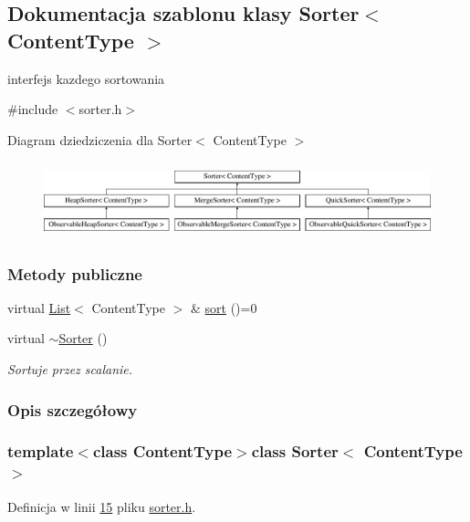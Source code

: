 \hypertarget{class_sorter}{\subsection{Dokumentacja szablonu klasy Sorter$<$ Content\-Type $>$}
\label{class_sorter}
}


interfejs kazdego sortowania  




{\ttfamily \#include $<$sorter.\-h$>$}

Diagram dziedziczenia dla Sorter$<$ Content\-Type $>$\begin{figure}[H]
\begin{center}
\leavevmode
\includegraphics[height=2.213439cm]{class_sorter}
\end{center}
\end{figure}
\subsubsection*{Metody publiczne}
\begin{DoxyCompactItemize}
\item 
virtual \hyperlink{class_list}{List}$<$ Content\-Type $>$ \& \hyperlink{class_sorter_a880cfd8969b78557ed207ad6f2bd4819}{sort} ()=0
\item 
virtual \hyperlink{class_sorter_a342ce2c818a08a76362f898446f023ee}{$\sim$\-Sorter} ()
\begin{DoxyCompactList}\small\item\em Sortuje przez scalanie. \end{DoxyCompactList}\end{DoxyCompactItemize}


\subsubsection{Opis szczegółowy}
\subsubsection*{template$<$class Content\-Type$>$class Sorter$<$ Content\-Type $>$}



Definicja w linii \hyperlink{sorter_8h_source_l00015}{15} pliku \hyperlink{sorter_8h_source}{sorter.\-h}.



